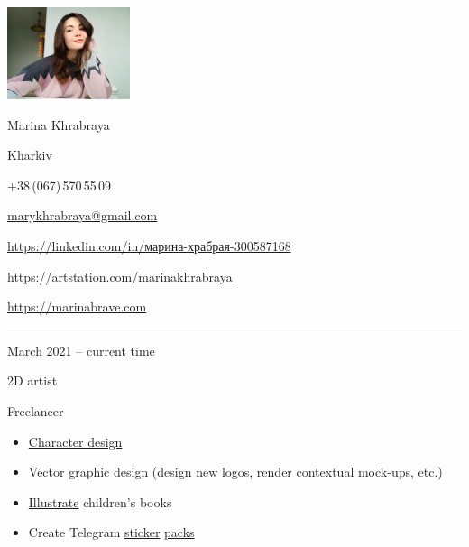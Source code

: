 \documentclass[a4paper,10pt]{article}
\newlength{\cvcolumngapwidth}
\newlength{\cvleftcolumnwidth}
\newlength{\cvrightcolumnwidth}
\newcommand{\cvnamestyle}[1]{{\Large\cvnamefont\textcolor{cvnamecolor}{#1}}}
\newcommand{\cvsectionstyle}[1]{{\normalsize\cvsectionfont\textcolor{cvsectioncolor}{#1}}}
\newcommand{\cvtitlestyle}[1]{{\large\cvtitlefont\textcolor{cvtitlecolor}{#1}}}
\newcommand{\cvdurationstyle}[1]{{\small\cvdurationfont\textcolor{cvdurationcolor}{#1}}}
\newlength{\cvafteritemskipamount}
\newlength{\cvaftersectionskipamount}
\newlength{\cvafternameskipamount}
\newlength{\cvafterpersonalinfolineskipamount}
\newlength{\cvaftertitleskipamount}
\newlength{\cvparskip}
\newcommand{\cvpersonalinfo}[2]{
\begin{minipage}[t]{\cvleftcolumnwidth}
    \vspace{0mm} %
    \raggedleft #1
\end{minipage}%
\hspace{\cvcolumngapwidth}%
\begin{minipage}[t]{\cvrightcolumnwidth}
    \vspace{0mm} %
    #2
\end{minipage}

\vspace{\cvafteritemskipamount}
}
\newcommand{\cvname}[1]{
\cvnamestyle{#1}

\vspace{\cvafternameskipamount}
}
\newcommand{\cvpersonalinfolinewithicon}[3]{
\raisebox{.5\fontcharht\font`E-.5\height}{\texttt{[image: \#2]}}
#3

\vspace{\cvafterpersonalinfolineskipamount}
}
\newcommand{\cvsection}[1]{
\begin{minipage}[t]{\cvleftcolumnwidth}
    \raggedleft\cvsectionstyle{#1}
\end{minipage}%
\hspace{\cvcolumngapwidth}%
\begin{minipage}[t]{\cvrightcolumnwidth}
    \textcolor{cvrulecolor}{\rule{\cvrightcolumnwidth}{0.3mm}}
\end{minipage}

\vspace{\cvaftersectionskipamount}
}
\newcommand{\cvitem}[2]{
\begin{minipage}[t]{\cvleftcolumnwidth}
    \raggedleft #1
\end{minipage}%
\hspace{\cvcolumngapwidth}%
\begin{minipage}[t]{\cvrightcolumnwidth}
    \setlength{\parskip}{\cvparskip} #2
\end{minipage}

\vspace{\cvafteritemskipamount}
}
\newcommand{\cvtitle}[1]{
\cvtitlestyle{#1}

\vspace{\cvaftertitleskipamount}
\vspace{-\cvparskip}
}
\begin{document}
\hypersetup{
    linkcolor=blue,
    filecolor=magenta,
    urlcolor=cyan,
}



\cvpersonalinfo{
\includegraphics[trim={36cm 20cm 25cm 0cm},clip,width=36mm]{resources/photo.jpg}
}{
\cvname{Marina Khrabraya}

\cvpersonalinfolinewithicon{height=4mm}{resources/IcoMoon-Free-PDF/072-location.pdf}{
Kharkiv
}

\cvpersonalinfolinewithicon{height=4mm}{resources/IcoMoon-Free-PDF/067-phone.pdf}{
+38\,(067)\,570\,55\,09
}

\cvpersonalinfolinewithicon{height=4mm}{resources/IcoMoon-Free-PDF/070-envelop.pdf}{
\href{mailto://marykhrabraya@gmail.com}{marykhrabraya@gmail.com}
}

\cvpersonalinfolinewithicon{height=4mm}{resources/IcoMoon-Free-PDF/458-linkedin.pdf}{
\href{https://www.linkedin.com/in/\%D0\%BC\%D0\%B0\%D1\%80\%D0\%B8\%D0\%BD\%D0\%B0-\%D1\%85\%D1\%80\%D0\%B0\%D0\%B1\%D1\%80\%D0\%B0\%D1\%8F-300587168/}{https://linkedin.com/in/марина-храбрая-300587168}
}

\cvpersonalinfolinewithicon{height=4mm}{"resources/ArtStationLogo/vector/ArtStation-logomark-dark.eps"}{
\href{https://artstation.com/marinakhrabraya}{https://artstation.com/marinakhrabraya}
}

\cvpersonalinfolinewithicon{height=4mm}{resources/IcoMoon-Free-PDF/203-earth.pdf}{
\href{https://marinabrave.com}{https://marinabrave.com}
}
}



\cvsection{WORK EXPERIENCE}

\cvitem{
\cvdurationstyle{March 2021 -- current time}
}{
\cvtitle{2D artist}

Freelancer

\begin{itemize}[leftmargin=*]
    \item \href{https://www.artstation.com/artwork/rAG99J}{Character design}
    \item Vector graphic design (design new logos, render contextual mock-ups, etc.)
    \item \href{https://www.artstation.com/artwork/5X3PWz}{Illustrate} children's books
    \item Create Telegram \href{https://t.me/addstickers/Nixraccoon}{sticker} \href{https://t.me/addstickers/Mam_rental}{packs}
\end{itemize}
}
\end{document}
